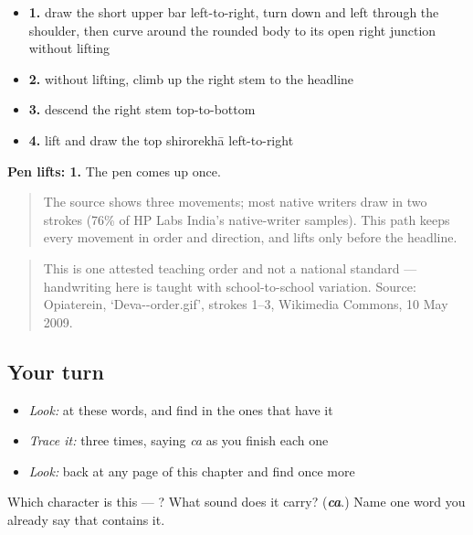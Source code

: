\begin{itemize}
\raggedright
  \item \textbf{1.} draw the short upper bar left-to-right, turn down and left through the shoulder, then curve around the rounded body to its open right junction without lifting
  \item \textbf{2.} without lifting, climb up the right stem to the headline
  \item \textbf{3.} descend the right stem top-to-bottom
  \item \textbf{4.} lift and draw the top shirorekhā left-to-right
\end{itemize}

\textbf{Pen lifts: 1.} The pen comes up once.

\begin{quote}
The source shows three movements; most native writers draw  in two strokes (76\% of HP Labs India's native-writer samples). This path keeps every movement in order and direction, and lifts only before the headline.
\end{quote}

\begin{quote}
This is one attested teaching order and not a national standard — handwriting here is taught with school-to-school variation. Source: Opiaterein, ‘Deva--order.gif’, strokes 1–3, Wikimedia Commons, 10 May 2009.
\end{quote}

\subsection*{Your turn}
\begin{itemize}
\raggedright
  \item \emph{Look:} at these words, and find  in the ones that have it
\end{itemize}

\begin{quote}
\end{quote}

\begin{itemize}
\raggedright
  \item \emph{Trace it:}  three times, saying \emph{ca} as you finish each one
  \item \emph{Look:} back at any page of this chapter and find  once more
\end{itemize}

\begin{tcolorbox}[breakable,colback=teal!4,colframe=teal!35!black,title={Before you move on}]
Which character is this — ? What sound does it carry? (\emph{\textbf{ca}}.) Name one word you already say that contains it.
\end{tcolorbox}
